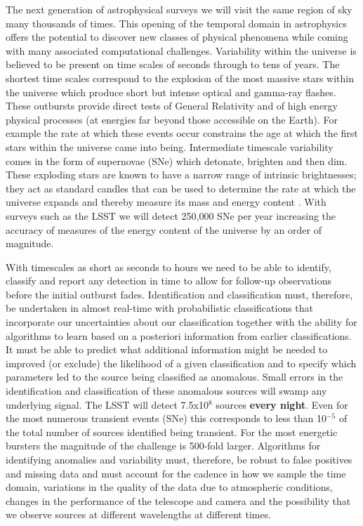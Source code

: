 \documentclass[useAMS,usenatbib,tightenlines,11pt,preprint]{aastex}
\begin{document}
The next generation of astrophysical surveys we will visit the same
region of sky many thousands of times. This opening of the temporal
domain in astrophysics offers the potential to discover new classes of
physical phenomena while coming with many associated computational
challenges. Variability within the universe is believed to be present
on time scales of seconds through to tens of years. The shortest time
scales correspond to the explosion of the most massive stars within
the universe which produce short but intense optical and gamma-ray
flashes. These outbursts provide direct tests of General Relativity
and of high energy physical processes (at energies far beyond those
accessible on the Earth). For example the rate at which these events
occur constrains the age at which the first stars within the universe
came into being. Intermediate timescale variability comes in the form
of supernovae (SNe) which detonate, brighten and then dim. These
exploding stars are known to have a narrow range of intrinsic
brightnesses; they act as standard candles that can be used to
determine the rate at which the universe expands and thereby measure
its mass and energy content \cite{perlmutter99}. 
With surveys such as the LSST we will detect 250,000 SNe per year
increasing the accuracy of measures of the energy content of the
universe by an order of magnitude.

With timescales as short as seconds to hours we need to be able to
identify, classify and report any detection in time to allow for
follow-up observations before the initial outburst
fades. Identification and classification must, therefore, be
undertaken in almost real-time with probabilistic classifications that
incorporate our uncertainties about our classification together with
the ability for algorithms to learn based on a posteriori information
from earlier classifications. It must be able to predict what
additional information might be needed to improved (or exclude) the
likelihood of a given classification and to specify which parameters
led to the source being classified as anomalous. Small errors in the
identification and classification of these anomalous sources will
swamp any underlying signal. The LSST will detect 7.5x10$^8$ sources
{\bf every night}. Even for the most numerous transient events (SNe)
this corresponds to less than 10$^{-5}$ of the total number of sources
identified being transient. For the most energetic bursters the
magnitude of the challenge is 500-fold larger.  Algorithms for
identifying anomalies and variability must, therefore, be robust to
false positives and missing data and must account for the cadence in
how we sample the time domain, variations in the quality of the data
due to atmospheric conditions, changes in the performance of the
telescope and camera and the possibility that we observe sources at
different wavelengths at different times.
\end{document}
